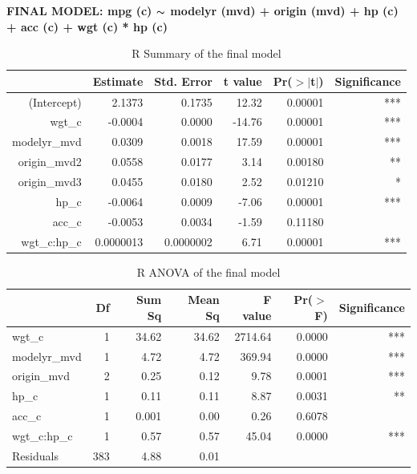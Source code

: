 \documentclass{article}
\newcommand{\mt}[1]{\ensuremath{#1}}
\newcommand{\tl}{\mt{\thicksim} }
\begin{document}
\clearpage
\newpage 

\textbf{FINAL MODEL: mpg (c) \tl modelyr (mvd) + origin (mvd) + hp (c) + acc (c) + wgt (c) * hp (c)}

\begin{table}[ht]
\centering
\begin{tabular}{rrrrrr}
  \hline
 & Estimate & Std. Error & t value & Pr($>$$|$t$|$) & Significance\\ 
  \hline
(Intercept) & 2.1373 & 0.1735 & 12.32 & 0.00001 & *** \\ 
  wgt\_c & -0.0004 & 0.0000 & -14.76 & 0.00001 & *** \\ 
  modelyr\_mvd & 0.0309 & 0.0018 & 17.59 & 0.00001 & *** \\ 
  origin\_mvd2 & 0.0558 & 0.0177 & 3.14 & 0.00180 & ** \\ 
  origin\_mvd3 & 0.0455 & 0.0180 & 2.52 & 0.01210 & * \\ 
  hp\_c & -0.0064 & 0.0009 & -7.06 & 0.00001 & *** \\ 
  acc\_c & -0.0053 & 0.0034 & -1.59 & 0.11180 & \\ 
  wgt\_c:hp\_c & 0.0000013 & 0.0000002 & 6.71 & 0.00001 & *** \\ 
   \hline
\end{tabular}
\caption{R Summary of the final model}
\label{tab:summaryfinalmodel}
\end{table}

\begin{table}[ht]
\centering
\begin{tabular}{lrrrrrr}
  \hline
 & Df & Sum Sq & Mean Sq & F value & Pr($>$F) & Significance \\ 
  \hline
wgt\_c & 1 & 34.62 & 34.62 & 2714.64 & 0.0000 & *** \\ 
  modelyr\_mvd & 1 & 4.72 & 4.72 & 369.94 & 0.0000 & *** \\ 
  origin\_mvd & 2 & 0.25 & 0.12 & 9.78 & 0.0001 & *** \\ 
  hp\_c & 1 & 0.11 & 0.11 & 8.87 & 0.0031 & ** \\ 
  acc\_c & 1 & 0.001 & 0.00 & 0.26 & 0.6078 & \\ 
  wgt\_c:hp\_c & 1 & 0.57 & 0.57 & 45.04 & 0.0000 & *** \\ 
  Residuals & 383 & 4.88 & 0.01 &  &  & \\ 
   \hline
\end{tabular}
\caption{R ANOVA of the final model}
\label{tab:anovafinalmodel}
\end{table}
\end{document}
